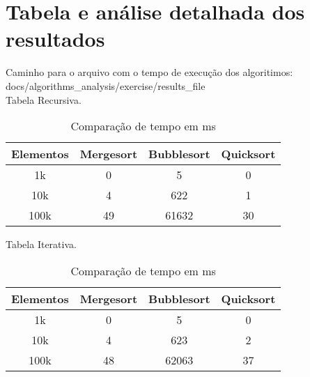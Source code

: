 \section{Tabela e análise detalhada dos resultados}
Caminho para o arquivo com o tempo de execução dos algoritimos: docs/algorithms_analysis/exercise/results_file \\

Tabela Recursiva. \\

\begin{table}[ht!]
    \centering
    \begin{tabular}{|c|c|c|c|}
    \hline
    \textbf{Elementos} &\textbf{Mergesort} & \textbf{Bubblesort} & \textbf{Quicksort} \\ \hline
     1k & 0 & 5 & 0  \\ \hline
     10k & 4 & 622 & 1  \\ \hline
     100k & 49 & 61632 & 30  \\ \hline
    \end{tabular}  
    \caption{Comparação de tempo em ms}
\end{table}

Tabela Iterativa. \\

\begin{table}[ht!]
    \centering
    \begin{tabular}{|c|c|c|c|}
    \hline
    \textbf{Elementos} &\textbf{Mergesort} & \textbf{Bubblesort} & \textbf{Quicksort} \\ \hline
     1k & 0 & 5 & 0  \\ \hline
     10k & 4 & 623 & 2  \\ \hline
     100k & 48 & 62063 & 37  \\ \hline
    \end{tabular}  
    \caption{Comparação de tempo em ms}
\end{table}



